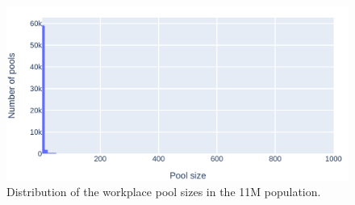 \begin{figure}
    \centering
    \includegraphics[width=.8\textwidth]{3 - Stride/fig/workplace_all_poolsizes.png}
    \caption{Distribution of the workplace pool sizes in the 11M population.}
    \label{fig:workplace_all_poolsizes}
\end{figure}

